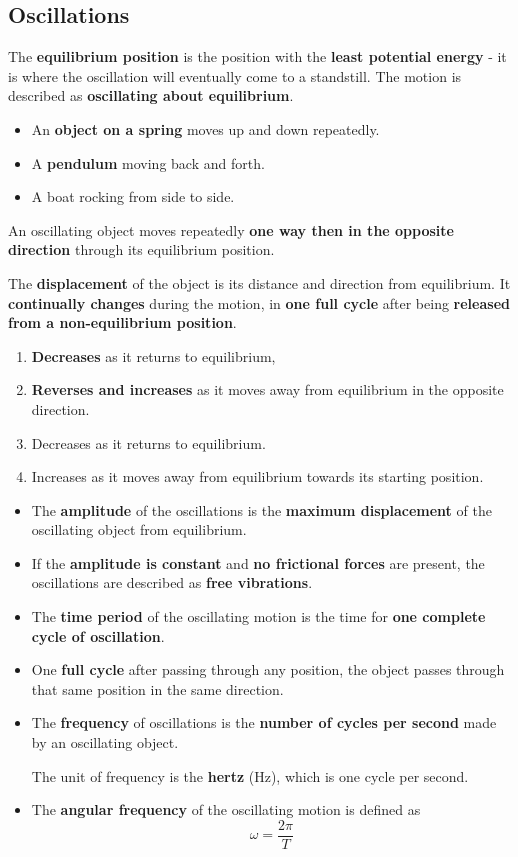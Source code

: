 \subsection{Oscillations}

The \textbf{equilibrium position} is the position with the \textbf{least potential energy} - it is where the oscillation will eventually come to a standstill. The motion is described as \textbf{oscillating about equilibrium}.

\begin{itemize}
    \item An \textbf{object on a spring} moves up and down repeatedly.
    \item A \textbf{pendulum} moving back and forth.
    \item A boat rocking from side to side.
\end{itemize}

An oscillating object moves repeatedly \textbf{one way then in the opposite direction} through its equilibrium position.

The \textbf{displacement} of the object is its distance and direction from equilibrium. It \textbf{continually changes} during the motion, in \textbf{one full cycle} after being \textbf{released from a non-equilibrium position}.
\begin{enumerate}
    \item \textbf{Decreases} as it returns to equilibrium,
    \item \textbf{Reverses and increases} as it moves away from equilibrium in the opposite direction.
    \item Decreases as it returns to equilibrium.
    \item Increases as it moves away from equilibrium towards its starting position.
\end{enumerate}

\begin{itemize}
    \item The \textbf{amplitude} of the oscillations is the \textbf{maximum displacement} of the oscillating object from equilibrium.
    \item If the \textbf{amplitude is constant} and \textbf{no frictional forces} are present, the oscillations are described as \textbf{free vibrations}.
    \item The \textbf{time period} of the oscillating motion is the time for \textbf{one complete cycle of oscillation}.
    \item One \textbf{full cycle} after passing through any position, the object passes through that same position in the same direction.
    \item The \textbf{frequency} of oscillations is the \textbf{number of cycles per second} made by an oscillating object.

        The unit of frequency is the \textbf{hertz} (Hz), which is one cycle per second.
    \item The \textbf{angular frequency} of the oscillating motion is defined as
        $$\omega=\dfrac{2\pi}{T}$$
\end{itemize}

